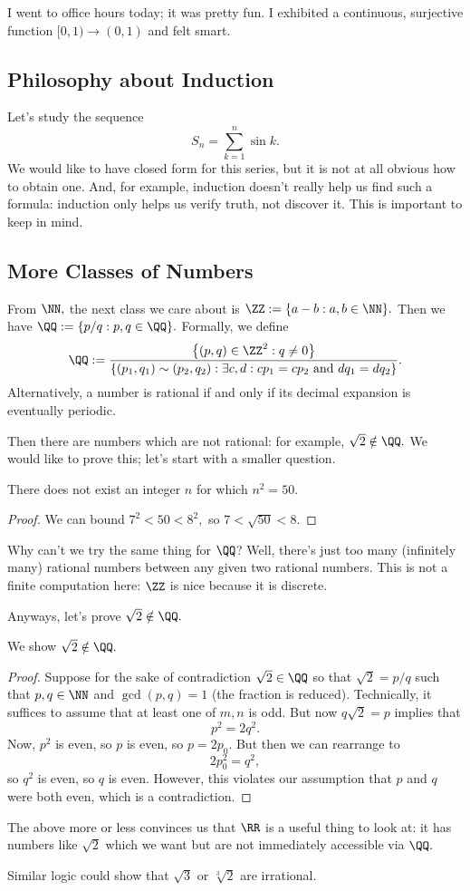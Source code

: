 \documentclass[../notes.tex]{subfiles}
\begin{document}
I went to office hours today; it was pretty fun. I exhibited a continuous, surjective function $[0,1)\to(0,1)$ and felt smart.

\subsection{Philosophy about Induction}
Let's study the sequence
\[S_n=\sum_{k=1}^n\sin k.\]
We would like to have closed form for this series, but it is not at all obvious how to obtain one. And, for example, induction doesn't really help us find such a formula: induction only helps us verify truth, not discover it. This is important to keep in mind.

\subsection{More Classes of Numbers}
From $\NN,$ the next class we care about is $\ZZ:=\{a-b:a,b\in\NN\}.$ Then we have $\QQ:=\{p/q:p,q\in\QQ\}.$ Formally, we define
\[\QQ:=\frac{\left\{(p,q)\in\ZZ^2:q\ne0\right\}}{\{(p_1,q_1)\sim(p_2,q_2):\exists c,d:cp_1=cp_2\text{ and }dq_1=dq_2\}}.\]
Alternatively, a number is rational if and only if its decimal expansion is eventually periodic.

Then there are numbers which are not rational: for example, $\sqrt2\notin\QQ.$ We would like to prove this; let's start with a smaller question.
\begin{prop}
	There does not exist an integer $n$ for which $n^2=50.$
\end{prop}
\begin{proof}
	We can bound $7^2<50<8^2,$ so $7<\sqrt{50}<8.$
\end{proof}
Why can't we try the same thing for $\QQ$? Well, there's just too many (infinitely many) rational numbers between any given two rational numbers. This is not a finite computation here: $\ZZ$ is nice because it is discrete.

Anyways, let's prove $\sqrt2\notin\QQ.$
\begin{prop} \label{prop:sqrt2}
	We show $\sqrt2\notin\QQ.$
\end{prop}
\begin{proof}
	Suppose for the sake of contradiction $\sqrt2\in\QQ$ so that $\sqrt2=p/q$ such that $p,q\in\NN$ and $\gcd(p,q)=1$ (the fraction is reduced). Technically, it suffices to assume that at least one of $m,n$ is odd. But now $q\sqrt2=p$ implies that
	\[p^2=2q^2.\]
	Now, $p^2$ is even, so $p$ is even, so $p=2p_0.$ But then we can rearrange to
	\[2p_0^2=q^2,\]
	so $q^2$ is even, so $q$ is even. However, this violates our assumption that $p$ and $q$ were both even, which is a contradiction.
\end{proof}
\begin{remark}
	The above more or less convinces us that $\RR$ is a useful thing to look at: it has numbers like $\sqrt2$ which we want but are not immediately accessible via $\QQ.$
\end{remark}
Similar logic could show that $\sqrt3$ or $\sqrt[3]2$ are irrational.
\end{document}
